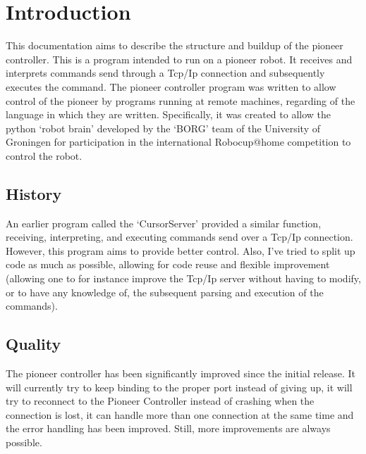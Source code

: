 \documentclass[a4paper, 12pt, oneside]{report}
\title{\titleVariable}
\author{\authorVariable}
\date{\centering First release: \firstRelease \\ Last modification: \today}
\begin{document}
\maketitle

\begin{abstract}
\end{abstract}

\tableofcontents

\section{Introduction}
This documentation aims to describe the structure and buildup of the pioneer
controller. This is a program intended to run on a pioneer robot. It receives
and interprets commands send through a Tcp/Ip connection and subsequently
executes the command. The pioneer controller program was written to allow
control of the pioneer by programs running at remote machines, regarding of the
language in which they are written. Specifically, it was created to allow the
python `robot brain' developed by the `BORG' team of the University of Groningen
for participation in the international Robocup@home competition to control the
robot.

\subsection{History}
An earlier program called the `CursorServer' provided a similar function,
receiving, interpreting, and executing commands send over a Tcp/Ip connection.
However, this program aims to provide better control. Also, I've tried to split
up code as much as possible, allowing for code reuse and flexible improvement
(allowing one to for instance improve the Tcp/Ip server without having to
modify, or to have any knowledge of, the subsequent parsing and execution of the
commands).

\subsection{Quality}
The pioneer controller has been significantly improved since the initial
release. It will currently try to keep binding to the proper port instead of
giving up, it will try to reconnect to the Pioneer Controller instead of
crashing when the connection is lost, it can handle more than one connection at
the same time and the error handling has been improved. Still, more improvements
are always possible. \\
\end{document}
